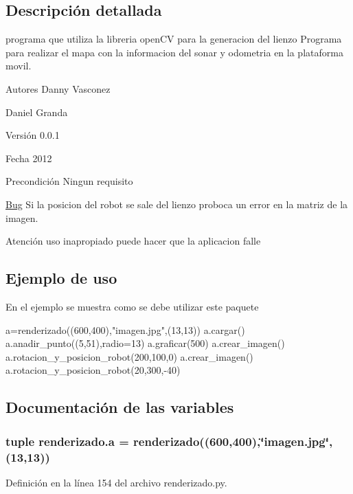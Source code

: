 \subsection{Descripción detallada}
programa que utiliza la libreria openCV para la generacion del lienzo Programa para realizar el mapa con la informacion del sonar y odometria en la plataforma movil. \begin{DoxyAuthor}{Autores}
Danny Vasconez 

Daniel Granda 
\end{DoxyAuthor}
\begin{DoxyVersion}{Versión}
0.0.1 
\end{DoxyVersion}
\begin{DoxyDate}{Fecha}
2012 
\end{DoxyDate}
\begin{DoxyPrecond}{Precondición}
Ningun requisito 
\end{DoxyPrecond}
\begin{Desc}
\item[\hyperlink{bug__bug000002}{Bug}]Si la posicion del robot se sale del lienzo proboca un error en la matriz de la imagen. \end{Desc}
\begin{DoxyWarning}{Atención}
uso inapropiado puede hacer que la aplicacion falle
\end{DoxyWarning}
\hypertarget{index_intro}{}\subsection{Ejemplo de uso}\label{index_intro}
En el ejemplo se muestra como se debe utilizar este paquete 
\begin{DoxyVerbInclude}
a=renderizado((600,400),"imagen.jpg",(13,13))
a.cargar()
a.anadir_punto((5,51),radio=13)
a.graficar(500)
a.crear_imagen()
a.rotacion_y_posicion_robot(200,100,0)
a.crear_imagen()
a.rotacion_y_posicion_robot(20,300,-40)


\end{DoxyVerbInclude}
 

\subsection{Documentación de las variables}
\hypertarget{namespacerenderizado_a67d5237e7cc5eff92a6e3b9d4782723e}{
\subsubsection[{a}]{\setlength{\rightskip}{0pt plus 5cm}tuple {\bf renderizado.a} = {\bf renderizado}((600,400),\char`\"{}imagen.jpg\char`\"{},(13,13))}}
\label{namespacerenderizado_a67d5237e7cc5eff92a6e3b9d4782723e}


Definición en la línea 154 del archivo renderizado.py.

